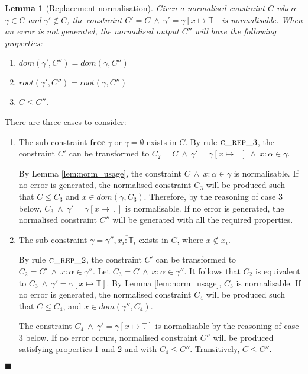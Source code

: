 \documentclass[preprint]{sigplanconf}
\newtheorem{lem}{Lemma}
\newcommand{\lemref}[1]{Lemma \ref{#1}}
\newcommand{\cand}{\:\wedge\:}
\newcommand{\free}[1]{\mathbf{free}\:#1}
\newcommand{\tinf}{\mathbb{T}}
\newcommand{\qed}{$\blacksquare$}
\newenvironment{proof}{\vspace{1ex}\noindent{\bf Proof}\hspace{0.5em}}
  {\hfill\qed\vspace{1ex}}
\begin{document}
\begin{lem}[Replacement normalisation]
\label{lem:norm_rep}
Given a normalised constraint $C$ where $\gamma \in C$ and $\gamma' \notin C$,
the constraint $C' = C \cand \gamma' = \gamma[x \mapsto \tinf]$ is normalisable. When
an error is not generated, the normalised output $C''$ will have the
following properties:

\begin{enumerate}
\item $dom(\gamma', C'') = dom(\gamma, C'')$
\item $root(\gamma', C'') = root(\gamma, C'')$
\item $C \leq C''$.
\end{enumerate}

\end{lem}
\begin{proof}

There are three cases to consider:

\begin{enumerate}

\item The sub-constraint $\free{\gamma}$ or $\gamma = \emptyset$ exists in
$C$. By rule $\textsc{c\_rep\_3}$, the constraint $C'$ can be transformed
to 
$C_2 = C \cand \gamma' = \gamma[x \mapsto \tinf] \cand x : \alpha \in \gamma$.

By \lemref{lem:norm_usage}, the constraint $C \cand x : \alpha \in \gamma$ is 
normalisable. If no
error is generated, the normalised constraint $C_3$ will be produced such
that $C \leq C_3$ and $x \in dom(\gamma, C_3)$. Therefore, by the 
reasoning of case 3 below, $C_3 \cand \gamma' = \gamma[x \mapsto \tinf]$ is 
normalisable. If no error is generated, the normalised constraint $C''$ will 
be generated with all the required properties.

\item The sub-constraint $\gamma = \gamma'', \overline{x_i : \tinf_i}$ exists
in $C$, where $x \notin \overline{x_i}$.

By rule $\textsc{c\_rep\_2}$, the
constraint $C'$ can be transformed to $C_2 = C' \cand x : \alpha \in \gamma''$.
Let $C_3 = C \cand x : \alpha \in \gamma''$. It follows that
$C_2$ is equivalent to $C_3 \cand \gamma' = \gamma[x \mapsto \tinf]$. 
By \lemref{lem:norm_usage}, $C_3$ is normalisable. If no
error is generated, the normalised constraint $C_4$ will be produced such that
$C \leq C_4$, and $x \in dom(\gamma'', C_4)$.

The constraint $C_4 \cand \gamma' = \gamma[x \mapsto \tinf]$ is normalisable
by the reasoning of case 3 below. 
If no error occurs, normalised constraint $C''$ will be produced satisfying
properties 1 and 2 and with $C_4 \leq C''$. Transitively, $C \leq C''$.


\end{enumerate}
\end{proof}
\end{document}
